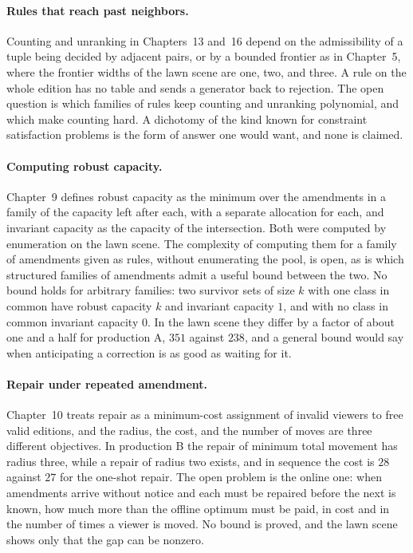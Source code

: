 \documentclass[11pt,twoside,openright]{book}
\theoremstyle{plain}
\theoremstyle{definition}
\theoremstyle{remark}
\begin{document}
\paragraph{Rules that reach past neighbors.} Counting and unranking in Chapters~13 and~16 depend on the admissibility of a tuple being decided by adjacent pairs, or by a bounded frontier as in Chapter~5, where the frontier widths of the lawn scene are one, two, and three. A rule on the whole edition has no table and sends a generator back to rejection. The open question is which families of rules keep counting and unranking polynomial, and which make counting hard. A dichotomy of the kind known for constraint satisfaction problems is the form of answer one would want, and none is claimed.

\paragraph{Computing robust capacity.} Chapter~9 defines robust capacity as the minimum over the amendments in a family of the capacity left after each, with a separate allocation for each, and invariant capacity as the capacity of the intersection. Both were computed by enumeration on the lawn scene. The complexity of computing them for a family of amendments given as rules, without enumerating the pool, is open, as is which structured families of amendments admit a useful bound between the two. No bound holds for arbitrary families: two survivor sets of size $k$ with one class in common have robust capacity $k$ and invariant capacity $1$, and with no class in common invariant capacity $0$. In the lawn scene they differ by a factor of about one and a half for production A, $351$ against $238$, and a general bound would say when anticipating a correction is as good as waiting for it.

\paragraph{Repair under repeated amendment.} Chapter~10 treats repair as a minimum-cost assignment of invalid viewers to free valid editions, and the radius, the cost, and the number of moves are three different objectives. In production B the repair of minimum total movement has radius three, while a repair of radius two exists, and in sequence the cost is $28$ against $27$ for the one-shot repair. The open problem is the online one: when amendments arrive without notice and each must be repaired before the next is known, how much more than the offline optimum must be paid, in cost and in the number of times a viewer is moved. No bound is proved, and the lawn scene shows only that the gap can be nonzero.
\end{document}
